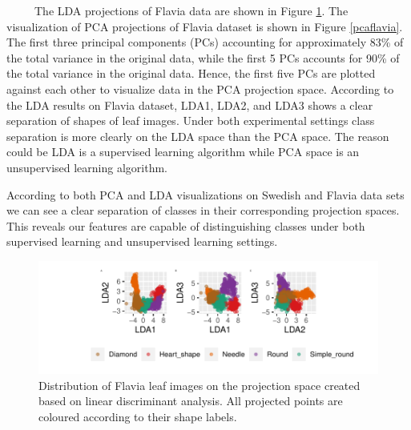 \documentclass{article}
\begin{document}
~~~~~The LDA projections of Flavia data are shown in Figure
\ref{ldaflavia}. The visualization of PCA projections of Flavia dataset
is shown in Figure \ref{pcaflavia}. The first three principal components
(PCs) accounting for approximately 83\% of the total variance in the
original data, while the first 5 PCs accounts for 90\% of the total
variance in the original data. Hence, the first five PCs are plotted
against each other to visualize data in the PCA projection space.
According to the LDA results on Flavia dataset, LDA1, LDA2, and LDA3
shows a clear separation of shapes of leaf images. Under both
experimental settings class separation is more clearly on the LDA space
than the PCA space. The reason could be LDA is a supervised learning
algorithm while PCA space is an unsupervised learning algorithm.

According to both PCA and LDA visualizations on Swedish and Flavia data
sets we can see a clear separation of classes in their corresponding
projection spaces. This reveals our features are capable of
distinguishing classes under both supervised learning and unsupervised
learning settings.

\begin{figure}
\centering
\includegraphics{img/ldaflavia-1.pdf}
\caption{\label{ldaflavia}Distribution of Flavia leaf images on the
projection space created based on linear discriminant analysis. All
projected points are coloured according to their shape labels.}
\end{figure}
\end{document}
